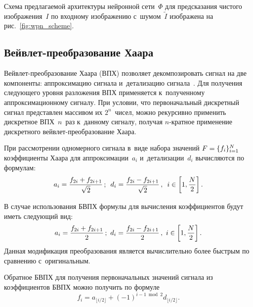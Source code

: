 \begin{multicols}{2}
Схема предлагаемой архитектуры нейронной сети~$\Phi$ для предсказания чистого 
изображения~$I$ по входному изображению с~шумом~$\tilde{I}$ изображена на 
рис.~\ref{fig:wpn_scheme}.



\subsection{Вейвлет-преобразование Хаара}

Вейвлет-преобразование Хаара (ВПХ) позволяет декомпозировать сигнал на две 
компоненты: аппроксимацию сигнала и~детализацию сигнала~\cite{WAVELETS_PAPER}. 
Для получения следующего уровня разложения ВПХ применяется к~полученному 
аппроксимационному сигналу. При условии, что первоначальный дискретный сигнал 
представлен массивом их $2^n$~чисел, можно рекурсивно применить дискретное ВПХ~$n$~раз 
к~данному сигналу, получая $n$-крат\-ное применение дискретного вейв\-лет-пре\-обра\-зо\-ва\-ние Хаара.

При рассмотрении одномерного сигнала в~виде набора значений $F \hm= \{ f_i \}_{i = 1}^{N}$ коэффициенты Хаара для аппроксимации~$a_{i}$ и~детализации~$d_{i}$ 
вычисляются по формулам:
\begin{equation*}
\label{eq:raw_haar}
a_{i} = \displaystyle\frac{\displaystyle f_{2i} + f_{2i + 1}\mathstrut}{\displaystyle \sqrt{2}\mathstrut}\,;\enskip d_{i} = \displaystyle\frac{\displaystyle f_{2i} - f_{2i + 
1}\mathstrut}{\displaystyle \sqrt{2}\mathstrut}\,,\enskip  i \in \left[1, \displaystyle\frac{\displaystyle N\mathstrut}{\displaystyle 2\mathstrut}\right].
\end{equation*}

В случае использования БВПХ формулы для 
вычисления коэффициентов будут иметь сле\-ду\-ющий вид:
\begin{equation*}
\label{eq:fast_haar}
a_{i} = \fr{f_{2i} + f_{2i + 1}}{2}\,;\ d_{i} = \fr{f_{2i} - f_{2i + 1}}{2}\,,\ 
i \in \left[1, \fr{N}{2}\right].
\end{equation*}
%
Данная модификация преобразования является вычислительно более быстрым по 
сравнению с~оригинальным.

Обратное БВПХ для получения первоначальных значений сигнала из коэффициентов 
БВПХ можно получить по формуле
\begin{equation*}
\label{eq:inv_fast_haar}
f_{i} = a_{\lfloor {i}/{2}\rfloor} + (-1)^{i - 1 \bmod{2}} 
d_{\lfloor {i}/{2}\rfloor}.
\end{equation*}


\end{multicols}
